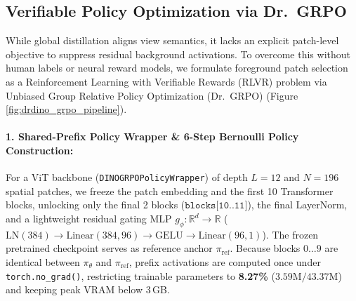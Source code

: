 \documentclass[11pt,a4paper]{article}
\begin{document}
\subsection{Verifiable Policy Optimization via Dr.\ GRPO}
\label{subsec:grpo_formulation}

While global distillation aligns view semantics, it lacks an explicit patch-level objective to suppress residual background activations. To overcome this without human labels or neural reward models, we formulate foreground patch selection as a Reinforcement Learning with Verifiable Rewards (RLVR) problem via Unbiased Group Relative Policy Optimization (Dr.\ GRPO) \cite{shao2024deepseekmath, liu2025drgrpo} (Figure \ref{fig:drdino_grpo_pipeline}).

\paragraph{1. Shared-Prefix Policy Wrapper \& 6-Step Bernoulli Policy Construction:}
For a ViT backbone (\texttt{DINOGRPOPolicyWrapper}) of depth $L=12$ and $N=196$ spatial patches, we freeze the patch embedding and the first 10 Transformer blocks, unlocking only the final 2 blocks ($\texttt{blocks[10..11]}$), the final LayerNorm, and a lightweight residual gating MLP $g_\phi: \mathbb{R}^d \to \mathbb{R}$ ($\text{LN}(384) \to \text{Linear}(384, 96) \to \text{GELU} \to \text{Linear}(96, 1)$). The frozen pretrained checkpoint serves as reference anchor $\pi_{\text{ref}}$. Because blocks $0\dots 9$ are identical between $\pi_\theta$ and $\pi_{\text{ref}}$, prefix activations are computed once under \texttt{torch.no\_grad()}, restricting trainable parameters to \textbf{8.27\%} ($3.59\text{M} / 43.37\text{M}$) and keeping peak VRAM below 3\,GB.
\end{document}
